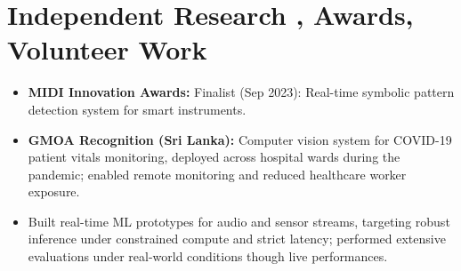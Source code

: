 \documentclass[11pt]{article}
\begin{document}
\section*{Independent Research , Awards, Volunteer Work}
\begin{itemize}[leftmargin=1.2em, itemsep=-0.25em]
    \item \textbf{MIDI Innovation Awards:} Finalist (Sep 2023): Real-time symbolic pattern detection system for smart instruments.
    \item \textbf{GMOA Recognition (Sri Lanka):} Computer vision system for COVID-19 patient vitals monitoring, deployed across hospital wards during the pandemic; enabled remote monitoring and reduced healthcare worker exposure.
    \item Built real-time ML prototypes for audio and sensor streams, targeting robust inference under constrained compute and strict latency; performed extensive evaluations under real-world conditions though live performances.
    



    
    
\end{itemize}
\end{document}

